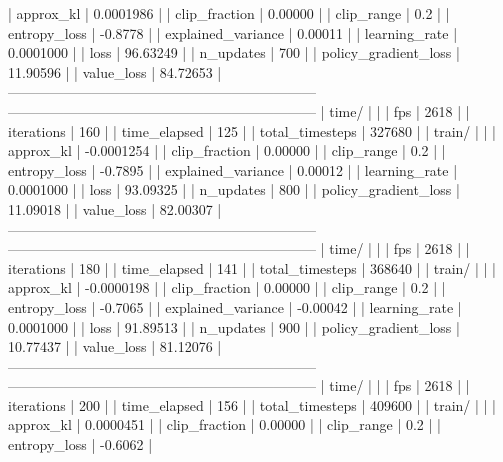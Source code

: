 |    approx_kl            |    0.0001986 |
|    clip_fraction        |      0.00000 |
|    clip_range           |          0.2 |
|    entropy_loss         |      -0.8778 |
|    explained_variance   |      0.00011 |
|    learning_rate        |    0.0001000 |
|    loss                 |     96.63249 |
|    n_updates            |          700 |
|    policy_gradient_loss |     11.90596 |
|    value_loss           |     84.72653 |
------------------------------------------------------------------
------------------------------------------------------------------
| time/                   |              |
|    fps                  |         2618 |
|    iterations           |          160 |
|    time_elapsed         |          125 |
|    total_timesteps      |       327680 |
| train/                  |              |
|    approx_kl            |   -0.0001254 |
|    clip_fraction        |      0.00000 |
|    clip_range           |          0.2 |
|    entropy_loss         |      -0.7895 |
|    explained_variance   |      0.00012 |
|    learning_rate        |    0.0001000 |
|    loss                 |     93.09325 |
|    n_updates            |          800 |
|    policy_gradient_loss |     11.09018 |
|    value_loss           |     82.00307 |
------------------------------------------------------------------
------------------------------------------------------------------
| time/                   |              |
|    fps                  |         2618 |
|    iterations           |          180 |
|    time_elapsed         |          141 |
|    total_timesteps      |       368640 |
| train/                  |              |
|    approx_kl            |   -0.0000198 |
|    clip_fraction        |      0.00000 |
|    clip_range           |          0.2 |
|    entropy_loss         |      -0.7065 |
|    explained_variance   |     -0.00042 |
|    learning_rate        |    0.0001000 |
|    loss                 |     91.89513 |
|    n_updates            |          900 |
|    policy_gradient_loss |     10.77437 |
|    value_loss           |     81.12076 |
------------------------------------------------------------------
------------------------------------------------------------------
| time/                   |              |
|    fps                  |         2618 |
|    iterations           |          200 |
|    time_elapsed         |          156 |
|    total_timesteps      |       409600 |
| train/                  |              |
|    approx_kl            |    0.0000451 |
|    clip_fraction        |      0.00000 |
|    clip_range           |          0.2 |
|    entropy_loss         |      -0.6062 |
